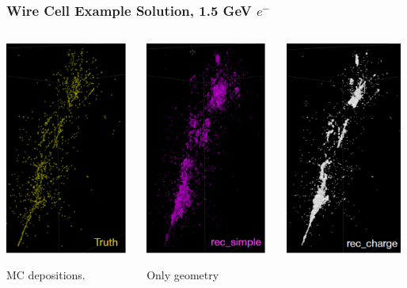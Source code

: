 \documentclass[xcolor=dvipsnames]{beamer}
\begin{document}
\begin{frame}
  \frametitle{Wire Cell Example Solution, 1.5 GeV $e^-$}
    \begin{columns}
      \begin{column}{0.33\paperwidth}
        \begin{center}
          \includegraphics[height=7cm]{ele-truth.png}

          \scriptsize MC depositions.
        \end{center}
      \end{column}
      \begin{column}{0.33\paperwidth}
        \begin{center}
          \includegraphics[height=7cm]{ele-simple.png}

          \scriptsize Only geometry
        \end{center}
      \end{column}
      \begin{column}{0.33\paperwidth}
        \begin{center}
          \includegraphics[height=7cm]{ele-charge.png}


\end{center}
\end{column}
\end{columns}
\end{frame}
\end{document}
